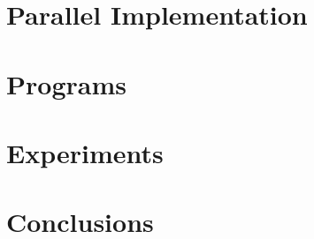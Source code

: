 \documentclass{sigplanconf}[9pt]
\begin{document}
\section{Parallel Implementation}


\section{Programs}\label{sec:programs}


\section{Experiments}


\section{Conclusions}


\appendix





\end{document}
